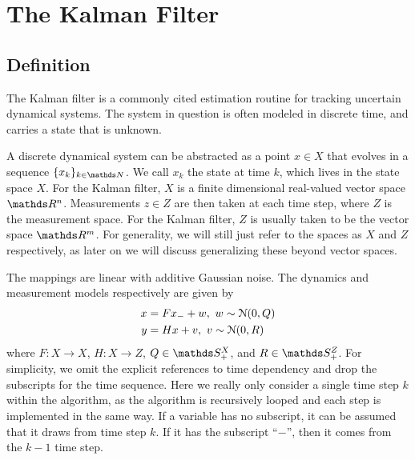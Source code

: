 \section{The Kalman Filter}

\subsection{Definition}

The Kalman filter is a commonly cited estimation routine for tracking uncertain dynamical systems.
The system in question is often modeled in discrete time, and carries a state that is unknown. 

A discrete dynamical system can be abstracted as a point $x\in X$ that evolves in a sequence $\{x_k\}_{k\in \naturals}$.
We call $x_k$ the state at time $k$, which lives in the state space $X$. For the Kalman filter, $X$ is a finite dimensional real-valued vector space $\reals^n$.
Measurements $z\in Z$ are then taken at each time step, where $Z$ is the measurement space. For the Kalman filter, $Z$ is usually taken to be the vector space $\reals^m$. For generality, we will still just refer to the spaces as $X$ and $Z$ respectively, as later on we will discuss generalizing these beyond vector spaces.

The mappings are linear with additive Gaussian noise. The dynamics and measurement models respectively are given by
\begin{equation}
	\label{kalman-filter-models}
	\begin{aligned}
		x &= Fx_- + w,\ w\sim\mathcal{N}(0,Q)\\
		y &= Hx + v,\ v\sim\mathcal{N}(0,R)
	\end{aligned}
\end{equation}
where $F:X\rightarrow X$, $H:X\rightarrow Z$, $Q\in \symmetric^X_+$, and $R\in\symmetric^Z_+$.
For simplicity, we omit the explicit references to time dependency and drop the subscripts for the time sequence.
Here we really only consider a single time step $k$ within the algorithm, as the algorithm is recursively looped and each step is implemented in the same way. If a variable has no subscript, it can be assumed that it draws from time step $k$. If it has the subscript ``$-$'', then it comes from the $k-1$ time step.


